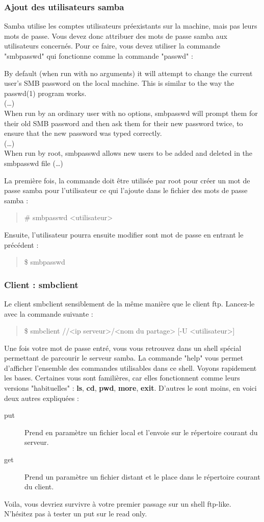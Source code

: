 \documentclass[a4paper,11pt]{article}
\newcommand{\commande}[1] {
    \begin{quote}
    \tt\raggedright #1
    \end{quote}
}
\newcommand{\man}[2]{
    \begin{tcolorbox}[toprule=3mm,width=\textwidth,outer arc=0mm,colbacktitle=grayman,coltitle=black,colback={grayman},colframe={grayman},title={man : \tt #1}]
        \tt\raggedright #2
    \end{tcolorbox}
}
\begin{document}
\subsubsection{Ajout des utilisateurs samba}
\par Samba utilise les comptes utilisateurs préexistants sur la machine, mais pas leurs mots de passe. Vous devez donc attribuer des mots de passe samba aux utilisateurs concernés. Pour ce faire, vous devez utiliser la commande "smbpasswd" qui fonctionne comme la commande "passwd" :
\man{smbpasswd}{
By default (when run with no arguments) it will attempt to change the current user's SMB password on the local machine. This is similar to the way the passwd(1) program works.\\
(\dots)\\
When run by an ordinary user with no options, smbpasswd will prompt them for their old SMB password and then ask them for their new password twice, to ensure that the new password was typed correctly.\\
(\dots)\\
When run by root, smbpasswd allows new users to be added and deleted in the smbpasswd file (\dots)\\
}
\par La première fois, la commande doit être utilisée par root pour créer un mot de passe samba pour l'utilisateur ce qui l'ajoute dans le fichier des mots de passe samba :
\commande{\# smbpasswd <utilisateur>}
\par Ensuite, l'utilisateur pourra ensuite modifier sont mot de passe en entrant le précédent :
\commande{\$ smbpasswd}

\subsubsection{Client : smbclient}
\par Le client smbclient sensiblement de la même manière que le client ftp. Lancez-le avec la commande suivante :
\commande{\$ smbclient //<ip serveur>/<nom du partage> [-U <utilisateur>]}
\par Une fois votre mot de passe entré, vous vous retrouvez dans un shell spécial permettant de parcourir le serveur samba. La commande "help" vous permet d'afficher l'ensemble des commandes utilisables dans ce shell. Voyons rapidement les bases. Certaines vous sont familières, car elles fonctionnent comme leurs versions "habituelles" : \textbf{ls}, \textbf{cd}, \textbf{pwd}, \textbf{more}, \textbf{exit}. D'autres le sont moins, en voici deux autres expliquées :
\begin{description}
\item[put] Prend en paramètre un fichier local et l'envoie sur le répertoire courant du serveur.
\item[get] Prend un paramètre un fichier distant et le place dans le répertoire courant du client.
\end{description}
\par Voila, vous devriez survivre à votre premier passage sur un shell ftp-like. N'hésitez pas à tester un put sur le read only.
\end{document}

